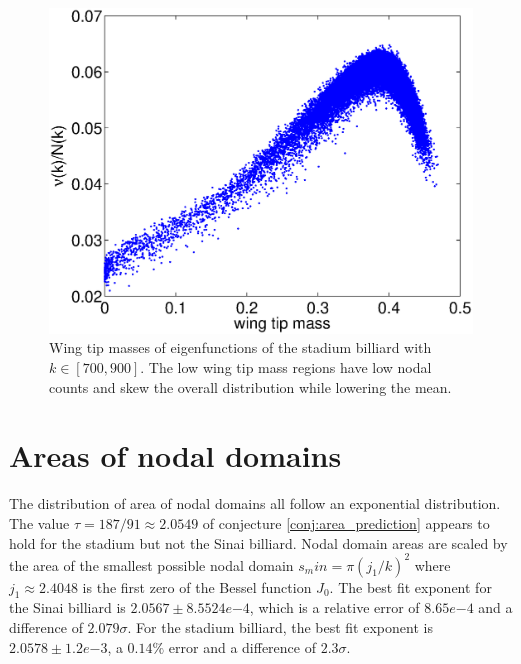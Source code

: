 \documentclass{report}
\begin{document}
\begin{figure}
  \begin{center}
    \includegraphics[width=\textwidth]{figs/results/qust_700_to_900_wtms.eps}
    \caption{Wing tip masses of eigenfunctions of the stadium billiard with $k \in [700, 900]$. The low wing tip mass regions have low nodal counts and skew the overall distribution while lowering the mean.}
    \label{fig:wtms}
  \end{center}
\end{figure}

\section{Areas of nodal domains}
The distribution of area of nodal domains all follow an exponential distribution. The value $\tau = 187/91 \approx 2.0549$ of conjecture \ref{conj:area_prediction} appears to hold for the stadium but not the Sinai billiard. Nodal domain areas are scaled by the area of the smallest possible nodal domain $s_min = \pi (j_{1} / k)^{2}$ where $j_{1} \approx 2.4048$ is the first zero of the Bessel function $J_{0}$. The best fit exponent for the Sinai billiard is $2.0567 \pm 8.5524e{-4}$, which is a relative error of $8.65e{-4}$ and a difference of $2.079 \sigma$. For the stadium billiard, the best fit exponent is $2.0578 \pm 1.2e{-3}$, a $0.14\%$ error and a difference of $2.3 \sigma$.
\end{document}
